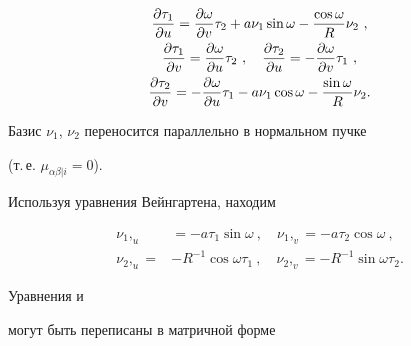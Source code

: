 \begin{gather}


\frac{\partial \tau_1}{\partial u} = \frac{\partial\omega}{\partial v} \tau_2


+ a \nu_1 \sin\omega - \frac{\cos\omega}{R} \nu_2 \ ,\notag\\


%


\label{GW-Gauss}


\frac{\partial \tau_1}{\partial v} = \frac{\partial\omega}{\partial u} \tau_2


\ , \quad \frac{\partial \tau_2}{\partial u} = - 


\frac{\partial\omega}{\partial v} \tau_1 \ ,\\


%


\frac{\partial \tau_2}{\partial v} = - \frac{\partial\omega}{\partial u} \tau_1


- a \nu_1 \cos\omega - \frac{\sin\omega}{R} \nu_2.\notag


\end{gather}


Базис $\nu_1$, $\nu_2$ переносится параллельно в нормальном пучке


(т.\,е. $\mu_{\alpha\beta|i} = 0$).


Используя уравнения Вейнгартена, находим


\begin{equation}


\label{GW-Weingarten}


\begin{split}


\nu_1,_u&=-a\tau_1 \sin\omega \ , \quad \nu_1,_v=- a \tau_2 \cos\omega \ ,\\


%


\nu_2,_u = &- R^{-1} \cos\omega \tau_1 \ , \quad


\nu_2,_v = - R^{-1} \sin\omega \tau_2.


\end{split}


\end{equation}


Уравнения  и 


могут быть переписаны в матричной форме


